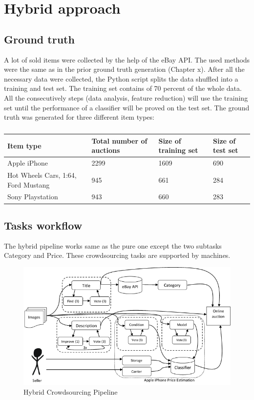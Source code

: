 \section{Hybrid approach}
\subsection{Ground truth}
A lot of sold items were collected by the help of the eBay API. The used methods were the same as in the prior ground truth generation (Chapter x). After all the necessary data were collected, the Python script splits the data shuffled into a training and test set. The training set contains of 70 percent of the whole data. All the consecutively steps (data analysis, feature reduction) will use the training set until the performance of a classifier will be proved on the test set. The ground truth was generated for three different item types:
\begin{table}[h!]
	\begin{center}
	\begin{tabular}{| p{5cm} | l | l | l |}
		\hline
		Item type & Total number of auctions & Size of training set & Size of test set \\
		\hline
		Apple iPhone & 2299 & 1609 & 690 \\
		\hline
		Hot Wheels Cars, 1:64, Ford Mustang & 945 & 661 & 284 \\
		\hline
		Sony Playstation & 943 & 660 & 283 \\
		\hline
	\end{tabular}
	\end{center}
	\caption{}
\end{table}
\subsection{Tasks workflow}
The hybrid pipeline works same as the pure one except the two subtasks Category and Price. These crowdsourcing tasks are supported by machines.
\begin{figure}[h!]
\centering
\includegraphics[scale=0.8]{images/pipelines/Hybrid_Pipeline.png}
\caption{Hybrid Crowdsourcing Pipeline}
\label{purePipeline}
\end{figure}
